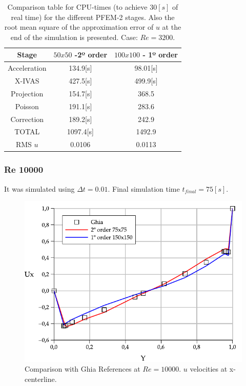 \documentclass[a4paper,conference]{IEEEtran}
\begin{document}
\begin{table}[htbp]
\begin{center}
{\footnotesize
\begin{tabular}[h]{||c|c|c||}
    \hline
      Stage & $50x50$  -2º order & $100x100$ - 1º order\\
      \hline
      \hline
	Acceleration & 134.9[s]& 98.01[s]\\
	X-IVAS & 427.5[s]& 499.9[s] \\
	Projection & 154.7[s]& 368.5\\
	Poisson & 191.1[s]& 283.6\\
	Correction & 189.2[s]& 242.9\\
      \hline
	TOTAL & 1097.4[s]& 1492.9\\
      \hline
      \hline
	RMS $u$ & 0.0106 & 0.0113 \\
      \hline
      \hline
\end{tabular}
}
\caption{\label{Tabla:times_Re_3200} Comparison table for CPU-times (to achieve $30[s]$ of real time) for the different PFEM-2 stages. Also the root mean square of the approximation error of $u$ at the end of the simulation is presented. Case: $Re=3200$.}
\end{center}
\end{table}

\newpage

\subsubsection{Re 10000}


It was simulated using $\Delta t = 0.01$. Final simulation time $t_{final} = 75[s]$.

\begin{figure}[htbp]
  \begin{center}
      \includegraphics[width=.85\linewidth]{images/Re_10000_Ux.pdf}
  \end{center}
  \caption{\label{fg:Re10000} Comparison with Ghia References at $Re=10000$. $u$ velocities at x-centerline.}
\end{figure}
\end{document}
